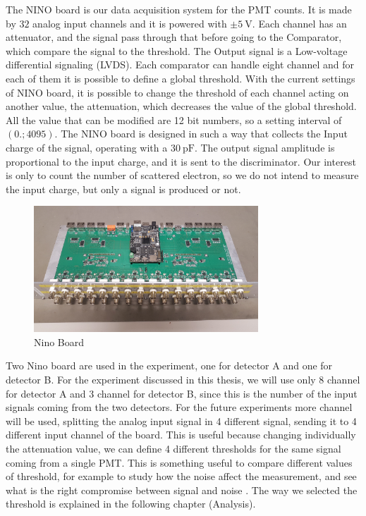 The NINO board is our data acquisition system for the PMT counts. It is made by $32$ analog input channels and it is powered with $\pm \SI{5}{\volt}$. Each channel has an attenuator, and the signal pass through that before going to the Comparator, which compare the signal to the threshold. The Output signal is a Low-voltage differential signaling (LVDS). Each comparator can handle eight channel and for each of them it is possible to define a global threshold. With the current settings of NINO board, it is possible to change the threshold of each channel acting on another value, the attenuation, which decreases the value of the global threshold. All the value that can be modified are 12 bit numbers, so a setting interval of $(0. ; 4095)$. \medskip
The NINO board is designed in such a way that collects the Input charge of the signal, operating with a $\SI{30}{\pico \farad}$. The output signal amplitude is proportional to the input charge, and it is sent to the discriminator. Our interest is only to count the number of scattered electron, so we do not intend to measure the input charge, but only a signal is produced or not.

\begin{figure}[hbtp]
\centering
\includegraphics[width = 0.75\textwidth]{ExperimentalSetup/NINO.jpg}
\caption{Nino Board}
\label{fig:NinoBoard}
\end{figure}

Two Nino board are used in the experiment, one for detector A and one for detector B. For the experiment discussed in this thesis, we will use only 8 channel for detector A and 3 channel for detector B, since this is the number of the input signals coming from the two detectors. For the future experiments more channel will be used, splitting the analog input signal in 4 different signal, sending it to 4 different input channel of the board. This is useful because changing individually the attenuation value, we can define 4 different thresholds for the same signal coming from a single PMT. This is something useful to compare different values of threshold, for example to study how the noise affect the measurement, and see what is the right compromise between signal and noise  .
The way we selected the threshold is explained in the following chapter (Analysis).

